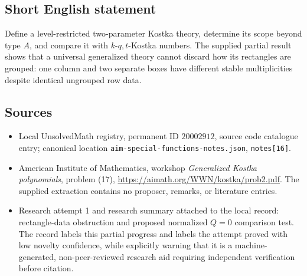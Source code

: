 \documentclass[11pt]{article}
\begin{document}
\subsection{Short English statement}
Define a level-restricted two-parameter Kostka theory, determine its scope beyond type $A$, and compare it with $k$-$q,t$-Kostka numbers. The supplied partial result shows that a universal generalized theory cannot discard how its rectangles are grouped: one column and two separate boxes have different stable multiplicities despite identical ungrouped row data.
\subsection{Sources}
\begin{itemize}
\item Local UnsolvedMath registry, permanent ID $20002912$, source code catalogue entry; canonical location \texttt{aim-special-functions-notes.json}, \texttt{notes[16]}.
\item American Institute of Mathematics, workshop \emph{Generalized Kostka polynomials}, problem (17), \url{https://aimath.org/WWN/kostka/prob2.pdf}. The supplied extraction contains no proposer, remarks, or literature entries.
\item Research attempt 1 and research summary attached to the local record: rectangle-data obstruction and proposed normalized $Q=0$ comparison test. The record labels this partial progress and labels the attempt proved with low novelty confidence, while explicitly warning that it is a machine-generated, non-peer-reviewed research aid requiring independent verification before citation.
\end{itemize}
\end{document}
